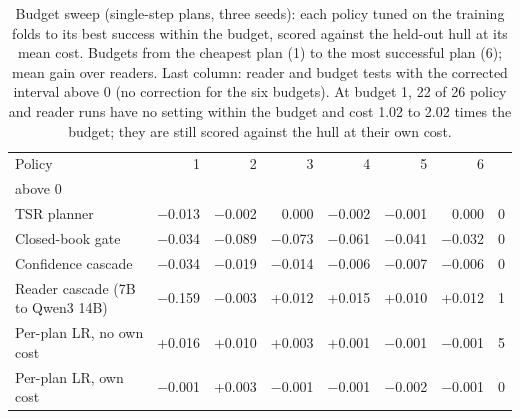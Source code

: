 \begin{table}[t]
\centering\small
\setlength{\tabcolsep}{4pt}
\caption{Budget sweep (single-step plans, three seeds): each policy tuned on the training folds to its best success within the budget, scored against the held-out hull at its mean cost. Budgets from the cheapest plan (1) to the most successful plan (6); mean gain over readers. Last column: reader and budget tests with the corrected interval above 0 (no correction for the six budgets). At budget 1, 22 of 26 policy and reader runs have no setting within the budget and cost 1.02 to 2.02 times the budget; they are still scored against the hull at their own cost.}
\label{tab:rev2_sweep}
\begin{tabular*}{\linewidth}{@{\extracolsep{\fill}}lrrrrrrr}
\toprule
Policy & 1 & 2 & 3 & 4 & 5 & 6 & \begin{tabular}[b]{@{}r@{}}Intervals \\ above 0\end{tabular} \\
\midrule
TSR planner & $-$0.013 & $-$0.002 & 0.000 & $-$0.002 & $-$0.001 & 0.000 & 0 \\
Closed-book gate & $-$0.034 & $-$0.089 & $-$0.073 & $-$0.061 & $-$0.041 & $-$0.032 & 0 \\
Confidence cascade & $-$0.034 & $-$0.019 & $-$0.014 & $-$0.006 & $-$0.007 & $-$0.006 & 0 \\
Reader cascade (7B to Qwen3 14B) & $-$0.159 & $-$0.003 & +0.012 & +0.015 & +0.010 & +0.012 & 1 \\
Per-plan LR, no own cost & +0.016 & +0.010 & +0.003 & +0.001 & $-$0.001 & $-$0.001 & 5 \\
Per-plan LR, own cost & $-$0.001 & +0.003 & $-$0.001 & $-$0.001 & $-$0.002 & $-$0.001 & 0 \\
\bottomrule
\end{tabular*}
\end{table}
